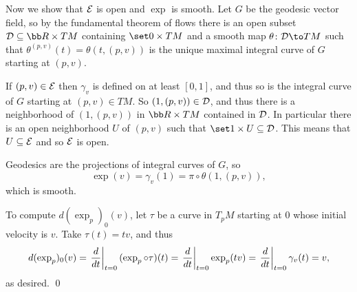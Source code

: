     Now we show that ${{\cal E}}$ is open and $\exp$ is smooth.
    Let $G$ be the geodesic vector field, so by the fundamental theorem of flows there is an open subset $\D\subseteq\bR\times TM$
    containing $\set 0\times TM$ and a smooth map $\theta\colon\D\to TM$ such that $\theta^{(p,v)}(t)=\theta(t,(p,v))$ is the unique
    maximal integral curve of $G$ starting at $(p,v)$.

    If $(p,v)\in{{\cal E}}$ then $\gamma_v$ is defined on at least $[0,1]$, and thus so is the integral curve of $G$ starting at $(p,v)\in TM$.
    So $(1,(p,v))\in{{\cal D}}$, and thus there is a neighborhood of $(1,(p,v))$ in $\bR\times TM$ contained in ${{\cal D}}$.
    In particular there is an open neighborhood $U$ of $(p,v)$ such that $\set1\times U\subseteq\D$.
    This means that $U\subseteq{{\cal E}}$ and so ${{\cal E}}$ is open.

    Geodesics are the projections of integral curves of $G$, so
    $$ \exp(v) = \gamma_v(1) = \pi\circ\theta(1,(p,v)) , $$
    which is smooth.

    To compute $d(\exp_p)_0(v)$, let $\tau$ be a curve in $T_pM$ starting at $0$ whose initial velocity is $v$.
    Take $\tau(t)=tv$, and thus
    $$ d(\exp_p)_0(v) = \left.{{d}\over{dt}}\right|_{t=0}(\exp_p\circ\tau)(t) = \left.{{d}\over{dt}}\right|_{t=0}\exp_p(tv) = \left.{{d}\over{dt}}\right|_{t=0}\gamma_v(t) = v , $$
    as desired.
    \qed

\eproof

